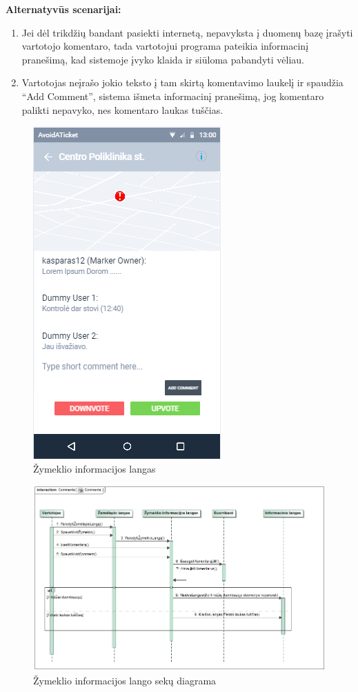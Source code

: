 \documentclass{VUMIFPSkursinis}
\begin{document}
	\textbf{Alternatyvūs scenarijai:}
	\begin{enumerate}[itemsep=-2mm]
		\item Jei dėl trikdžių bandant pasiekti internetą, nepavyksta į duomenų bazę įrašyti vartotojo komentaro, tada vartotojui programa pateikia informacinį pranešimą, kad sistemoje įvyko klaida ir siūloma pabandyti vėliau.
		\item Vartotojas neįrašo jokio teksto į tam skirtą komentavimo laukelį ir spaudžia “Add Comment”, sistema išmeta informacinį pranešimą, jog komentaro palikti nepavyko, nes komentaro laukas tuščias.
	\end{enumerate} 
		\begin{figure}[H]
				\centering
				\includegraphics[scale=0.6]{img/mockup_markerInfoWindow}
				\caption{Žymeklio informacijos langas}
				\label{img:Žymeklio informacijos langas1}
			\end{figure} 
		\begin{figure}[H]
				\centering
				\includegraphics[scale=0.5]{img/CommentsSequence}
				\caption{Žymeklio informacijos lango sekų diagrama}
				\label{img:Žymeklio informacijos langas RD}
			\end{figure}
\end{document}
